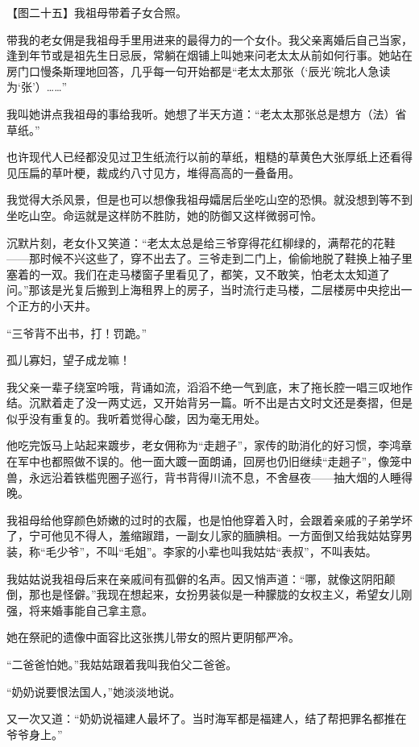 \clearpage
\par 【图二十五】我祖母带着子女合照。
\par 带我的老女佣是我祖母手里用进来的最得力的一个女仆。我父亲离婚后自己当家，逢到年节或是祖先生日忌辰，常躺在烟铺上叫她来问老太太从前如何行事。她站在房门口慢条斯理地回答，几乎每一句开始都是“老太太那张（‘辰光’皖北人急读为‘张’）……”
\par 我叫她讲点我祖母的事给我听。她想了半天方道：“老太太那张总是想方（法）省草纸。”
\par 也许现代人已经都没见过卫生纸流行以前的草纸，粗糙的草黄色大张厚纸上还看得见压扁的草叶梗，裁成约八寸见方，堆得高高的一叠备用。
\par 我觉得大杀风景，但是也可以想像我祖母孀居后坐吃山空的恐惧。就没想到等不到坐吃山空。命运就是这样防不胜防，她的防御又这样微弱可怜。
\par 沉默片刻，老女仆又笑道：“老太太总是给三爷穿得花红柳绿的，满帮花的花鞋——那时候不兴这些了，穿不出去了。三爷走到二门上，偷偷地脱了鞋换上袖子里塞着的一双。我们在走马楼窗子里看见了，都笑，又不敢笑，怕老太太知道了问。”那该是光复后搬到上海租界上的房子，当时流行走马楼，二层楼房中央挖出一个正方的小天井。
\par “三爷背不出书，打！罚跪。”
\par 孤儿寡妇，望子成龙嘛！
\par 我父亲一辈子绕室吟哦，背诵如流，滔滔不绝一气到底，末了拖长腔一唱三叹地作结。沉默着走了没一两丈远，又开始背另一篇。听不出是古文时文还是奏摺，但是似乎没有重复的。我听着觉得心酸，因为毫无用处。
\par 他吃完饭马上站起来踱步，老女佣称为“走趟子”，家传的助消化的好习惯，李鸿章在军中也都照做不误的。他一面大踱一面朗诵，回房也仍旧继续“走趟子”，像笼中兽，永远沿着铁槛兜圈子巡行，背书背得川流不息，不舍昼夜——抽大烟的人睡得晚。
\par 我祖母给他穿颜色娇嫩的过时的衣履，也是怕他穿着入时，会跟着亲戚的子弟学坏了，宁可他见不得人，羞缩踧踖，一副女儿家的腼腆相。一方面倒又给我姑姑穿男装，称“毛少爷”，不叫“毛姐”。李家的小辈也叫我姑姑“表叔”，不叫表姑。
\par 我姑姑说我祖母后来在亲戚间有孤僻的名声。因又悄声道：“哪，就像这阴阳颠倒，那也是怪僻。”我现在想起来，女扮男装似是一种朦胧的女权主义，希望女儿刚强，将来婚事能自己拿主意。
\par 她在祭祀的遗像中面容比这张携儿带女的照片更阴郁严冷。
\par “二爸爸怕她。”我姑姑跟着我叫我伯父二爸爸。
\par “奶奶说要恨法国人，”她淡淡地说。
\par 又一次又道：“奶奶说福建人最坏了。当时海军都是福建人，结了帮把罪名都推在爷爷身上。”
